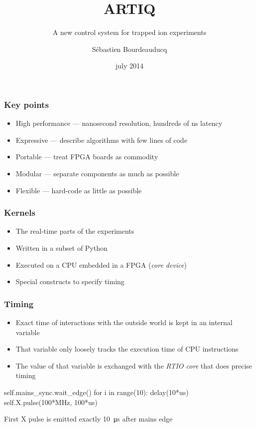 \documentclass{beamer}
\begin{document}
\selectfont

\title{ARTIQ}
\subtitle{A new control system for trapped ion experiments}
\author{\selectfont S\'ebastien Bourdeauducq}
\date{\selectfont july 2014}

\frame{\titlepage}

\begin{frame}
\frametitle{\selectfont Key points}
\begin{itemize}
\item High performance --- nanosecond resolution, hundreds of ns latency
\item Expressive --- describe algorithms with few lines of code
\item Portable --- treat FPGA boards as commodity
\item Modular --- separate components as much as possible
\item Flexible --- hard-code as little as possible
\end{itemize}
\end{frame}

\begin{frame}
\frametitle{\selectfont Kernels}
\begin{itemize}
\item The real-time parts of the experiments
\item Written in a subset of Python
\item Executed on a CPU embedded in a FPGA (\textit{core device})
\item Special constructs to specify timing
\end{itemize}
\end{frame}

\begin{frame}[fragile]
\frametitle{\selectfont Timing}
\begin{itemize}
\item Exact time of interactions with the outside world is kept in an internal variable
\item That variable only loosely tracks the execution time of CPU instructions
\item The value of that variable is exchanged with the \textit{RTIO core} that does precise timing
\end{itemize}
\begin{verbatimtab}
self.mains_sync.wait_edge()
for i in range(10):
    delay(10*us)
    self.X.pulse(100*MHz, 100*us)
\end{verbatimtab}
\center First X pulse is emitted exactly \SI{10}{\micro\second} after mains edge
\end{frame}
\end{document}
